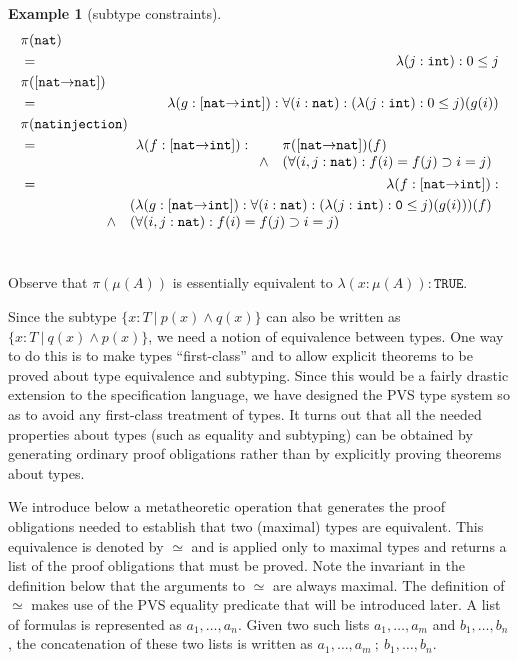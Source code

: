 \documentclass [12pt,twoside]{cslreport}
\newcommand{\thmbox}
   {{\ \hfill\hbox{%
      \vrule width1.0ex height1.0ex
   }\parfillskip 0pt }}
\newtheorem{example}[thm]{Example}
\newcommand{\aro}{\mathord\rightarrow} %
\newcommand{\funtype}[2]{[#1 \aro #2]}
\newcommand{\lis}[2]{#1_{1}, \ldots, #1_{#2}}
\newcommand{\ttint}{\mathtt{int}}
\newcommand{\ttnat}{\mathtt{nat}}
\newcommand{\vbar}{\ |\ }
\newenvironment{Eg}[1]{\begin{example}[#1]\label{eg:#1}\em }{\thmbox\end{example}}
\begin{document}
\begin{Eg}{subtype constraints}
\begin{eqnarray*}
\lefteqn{\pi(\ttnat)}\\
  & = & \lambda (j: \ttint): 0\leq j\\
\lefteqn{\pi(\funtype{\ttnat}{\ttnat})}\\
& = & \lambda (g : \funtype{\ttnat}{\ttint}): \forall (i:\ttnat): (\lambda
(j:\ttint): 0 \leq j)(g(i))\\
\lefteqn{\pi(\mathtt{natinjection})}\\
&= & \lambda (f : \funtype{\ttnat}{\ttint}) : 
\begin{array}[t]{cl}
& \pi(\funtype{\ttnat}{\ttnat})(f)\\
\wedge & (\forall (i, j: \ttnat): f(i) = f(j) \supset  i = j)
\end{array}\\
& = & 
\lambda (f : \funtype{\ttnat}{\ttint}) :\\&&\hspace*{.5in}
\begin{array}[t]{cl}
& (\lambda (g : \funtype{\ttnat}{\ttint}) : \forall (i: \ttnat):
(\lambda (j : \ttint): \mathtt{0}\leq j)(g(i)))(f) \\
\wedge & (\forall (i, j: \ttnat): f(i) = f(j) \supset  i = j)
\end{array}
\end{eqnarray*}
\end{Eg}
Observe that $\pi(\mu(A))$ is essentially equivalent to $\lambda (x : \mu(A)):
\mathtt{TRUE}$. 

Since the subtype $\{x : T \vbar p(x) \wedge q(x)\}$ can also be written
as $\{x : T \vbar q(x) \wedge p(x)\}$, we need a notion of equivalence
between types.  One way to do this is to make types ``first-class'' and to
allow explicit theorems to be proved about type equivalence and subtyping.
Since this would be a fairly drastic extension to the specification
language, we have designed the PVS type system so as to avoid any
first-class treatment of types.  It turns out that all the needed
properties about types (such as equality and subtyping) can be obtained by
generating ordinary proof obligations rather than by explicitly proving
theorems about types.

We introduce 
below a metatheoretic operation that generates the proof obligations
needed to establish that two (maximal) types are equivalent.  This
equivalence is denoted by $\simeq$ and is  applied only to maximal types
and returns a list of the 
proof obligations that must be proved.  Note the invariant in the
definition below that the arguments to $\simeq$ are always maximal.  The
definition of $\simeq$ makes use of the PVS equality predicate that will be
introduced later.  A list of formulas is represented as $a_1,\ldots, a_n$.
Given two such lists $\lis{a}{m}$ and $\lis{b}{n}$, the concatenation of
these two lists is written as $\lis{a}{m}\ ; \ \lis{b}{n}$\@.
\end{document}
